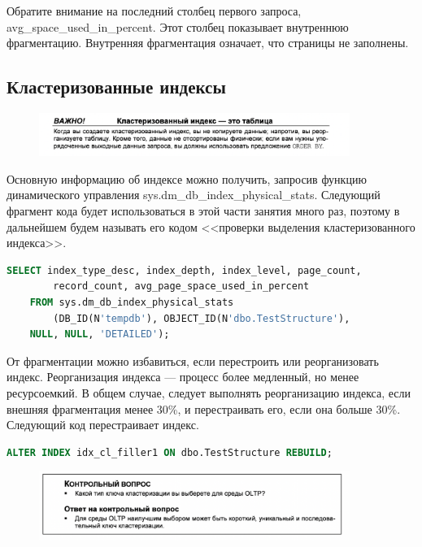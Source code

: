 Обратите внимание на последний столбец первого запроса, avg\_space\_used\_in\_percent. Этот столбец показывает внутреннюю фрагментацию. Внутренняя фрагментация означает, что страницы не заполнены.

\subsection{Кластеризованные индексы}

\begin{figure}[h!]
	\begin{center}
		\includegraphics[width=0.9\textwidth]{img/advice41.png}
	\end{center}
	\captionsetup{justification=centering}
\end{figure}



Основную информацию об индексе можно получить, запросив функцию динамического управления sys.dm\_db\_index\_physical\_stats. Следующий фрагмент кода будет использоваться в этой части занятия много раз, поэтому в дальнейшем будем называть его кодом <<проверки выделения кластеризованного индекса>>. 

\begin{lstlisting}[label=lst:funcReturn, language=sql]
	SELECT index_type_desc, index_depth, index_level, page_count,
		record_count, avg_page_space_used_in_percent
   	FROM sys.dm_db_index_physical_stats
		(DB_ID(N'tempdb'), OBJECT_ID(N'dbo.TestStructure'),
	NULL, NULL, 'DETAILED'); 
\end{lstlisting}


От фрагментации можно избавиться, если перестроить или реорганизовать индекс.
Реорганизация индекса — процесс более медленный, но менее ресурсоемкий.
В общем случае, следует выполнять реорганизацию индекса, если внешняя фрагментация менее 30\%, и перестраивать его, если она больше 30\%. Следующий код перестраивает индекс. 

\begin{lstlisting}[label=lst:funcReturn, language=sql]
	ALTER INDEX idx_cl_filler1 ON dbo.TestStructure REBUILD;
\end{lstlisting}

\begin{figure}[h!]
	\begin{center}
		\includegraphics[width=0.9\textwidth]{img/control42.png}
	\end{center}
	\captionsetup{justification=centering}
\end{figure}


